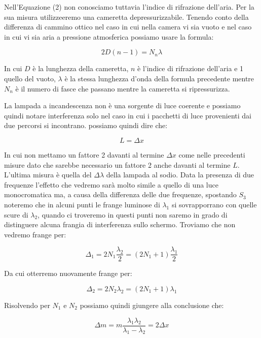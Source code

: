 \documentclass{article}
\begin{document}
Nell'Equazione (2) non conosciamo tuttavia l'indice di rifrazione dell'aria. Per la sua misura utilizzeeremo una cameretta depressurizzabile. Tenendo conto della differenza di cammino ottico nel caso in cui nella camera vi sia vuoto e nel caso in cui vi sia aria a pressione atmosferica possiamo usare la formula:

\begin{equation}
 2D (n - 1) = N_n \lambda
\end{equation}

In cui $D$ è la lunghezza della cameretta, $n$ è l'indice di rifrazione dell'aria e 1 quello del vuoto, $\lambda$ è la stessa lunghezza d'onda della formula precedente mentre $N_n$ è il numero di fasce  che passano mentre la cameretta si ripressurizza.

La lampada a incandescenza non è una sorgente di luce coerente e possiamo quindi notare interferenza solo nel caso in cui i pacchetti di luce provenienti dai due percorsi si incontrano. possiamo quindi dire che:

\begin{equation} 
L = \Delta{x} 
\end{equation}

In cui non mettamo un fattore 2 davanti al termine $\Delta{x}$ come nelle precedenti misure dato che sarebbe necessario un fattore 2 anche davanti al termine $L$.
L'ultima misura è quella del $\Delta\lambda$ della lampada al sodio. Data la presenza di due frequenze l'effetto che vedremo sarà molto simile a quello di una luce monocromatica ma, a causa della differenza delle due frequenze, spostando $S_3$ noteremo che in alcuni punti le frange luminose di $\lambda_1$ si sovrapporrano con quelle scure di $\lambda_2$, quando ci troveremo in questi punti non saremo in grado di distinguere alcuna frangia di interferenza sullo schermo. Troviamo che non vedremo frange per:

\begin{equation} 
\Delta_1 = 2 N_1 \frac{\lambda_2}{2} = (2 N_1 + 1) \frac{\lambda_1}{2} 
\end{equation}

Da cui otterremo nuovamente frange per:

\begin{equation} 
\Delta_2 = 2N_2 \lambda_2 =(2 N_1 + 1) \lambda_1 
\end{equation}

Risolvendo per $N_1$ e $N_2$ possiamo quindi giungere alla conclusione che:

\begin{equation} 
\Delta m = m \frac{\lambda_1 \lambda_2}{\lambda_1 {-} \lambda_2} = 2 \Delta{x} 
\end{equation}
\end{document}
